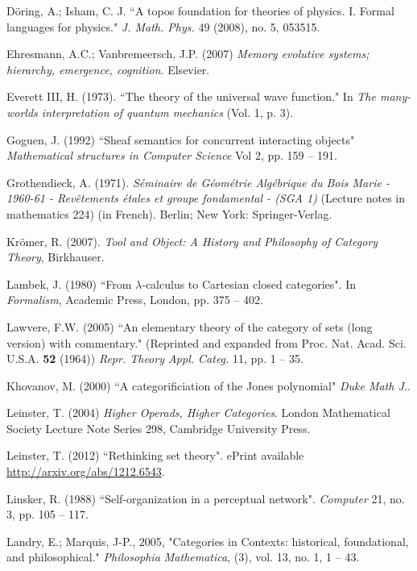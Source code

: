 \documentclass{book}
\theoremstyle{remark}
\theoremstyle{definition}
\begin{document}
\begin{thebibliography}{SGWB}
 D\"{o}ring, A.; Isham, C. J. ``A topos foundation for theories of physics. I. Formal languages for physics." 
{\em J. Math. Phys.} 49 (2008), no. 5, 053515.

 Ehresmann, A.C.; Vanbremeersch, J.P. (2007) {\em Memory evolutive systems; hierarchy, emergence, cognition}. Elsevier.

 Everett III, H. (1973). ``The theory of the universal wave function." In {\em The many-worlds interpretation of quantum mechanics} (Vol. 1, p. 3).

 Goguen, J. (1992) ``Sheaf semantics for concurrent interacting objects" {\em Mathematical structures in Computer Science} Vol 2, pp. 159 -- 191.

 Grothendieck, A. (1971). {\em S\'eminaire de G\'eom\'etrie Alg\'ebrique du Bois Marie - 1960-61 - Rev\^etements \'etales et groupe fondamental - (SGA 1)} (Lecture notes in mathematics 224) (in French). Berlin; New York: Springer-Verlag.

 Kr\"{o}mer, R. (2007). {\em Tool and Object: A History and Philosophy of Category Theory}, Birkhauser.

 Lambek, J. (1980) ``From $\lambda$-calculus to Cartesian closed categories". In {\em Formalism}, Academic Press, London, pp. 375 -- 402.

 Lawvere, F.W. (2005) ``An elementary theory of the category of sets (long version) with
   commentary." (Reprinted and expanded from Proc. Nat. Acad. Sci. U.S.A. {\bf 52}
   (1964)) {\em Repr. Theory Appl. Categ.} 11, pp. 1 -- 35.
   
 Khovanov, M. (2000) ``A categorificiation of the Jones polynomial" {\em Duke Math J.}.

 Leinster, T. (2004) {\em Higher Operads, Higher Categories}. London Mathematical Society Lecture Note Series 298, Cambridge University Press.

 Leinster, T. (2012) ``Rethinking set theory". ePrint available \url{http://arxiv.org/abs/1212.6543}.

 Linsker, R. (1988) ``Self-organization in a perceptual network". {\em Computer} 21, no. 3, pp. 105 -- 117.

 Landry, E.; Marquis, J-P., 2005, "Categories in Contexts: historical, foundational, and philosophical." {\em Philosophia Mathematica}, (3), vol. 13, no. 1, 1 -- 43.


\end{thebibliography}
\end{document}
